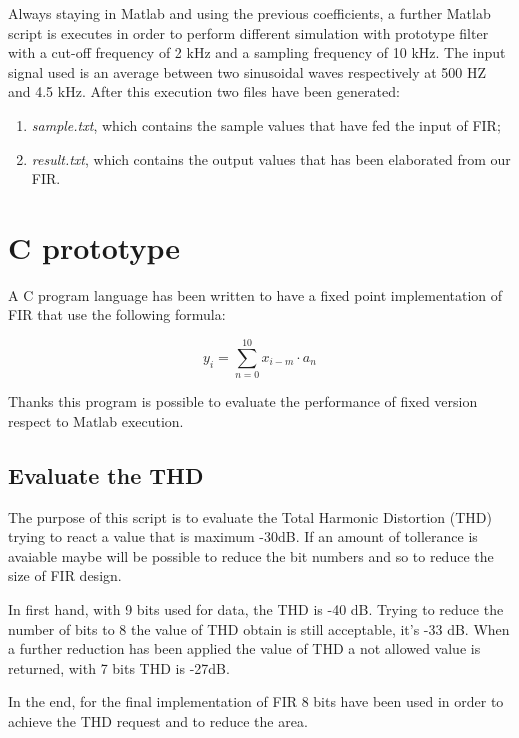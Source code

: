 Always staying in Matlab and using the previous coefficients, a further Matlab script is executes in order to perform
different simulation with prototype filter with a cut-off frequency of 2 kHz and a sampling frequency of 10 kHz. The input signal
used is an average between two sinusoidal waves respectively at 500 HZ and 4.5 kHz.
After this execution two files have been generated:

\begin{enumerate}
	\item \emph{sample.txt}, which contains the sample values that have fed the input of FIR;
	\item \emph{result.txt}, which contains the output values that has been elaborated from our FIR.
\end{enumerate}

\section{C prototype}

A C program language has been written to have a 
fixed point implementation of FIR that use the following formula:

\begin{displaymath}
y_i = \sum_{n=0}^{10}{x_{i-m} \cdot a_n}
\end{displaymath}

Thanks this program is possible to evaluate the performance of fixed version respect to 
Matlab execution.

\subsection{Evaluate the THD}

The purpose of this script is to evaluate the Total Harmonic Distortion (THD) trying to react a value that is
maximum -30dB. If an amount of tollerance is avaiable maybe will be possible to reduce 
the bit numbers and so to reduce the size of FIR design.


In first hand, with 9 bits used for data, the THD is -40 dB. Trying to reduce the number of bits to 8 the value of THD obtain 
is still acceptable, it's -33 dB. When a further reduction has been applied the value of THD a 
not allowed value is returned, with 7 bits THD is -27dB.

In the end, for the final implementation of FIR 8 bits have been used in order to achieve the THD request and 
to reduce the area.

